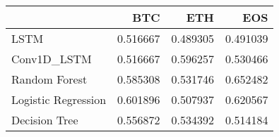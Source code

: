 \begin{tabular}{lrrr}
\toprule
{} &       BTC &       ETH &       EOS \\
\midrule
LSTM                &  0.516667 &  0.489305 &  0.491039 \\
Conv1D\_LSTM         &  0.516667 &  0.596257 &  0.530466 \\
Random Forest       &  0.585308 &  0.531746 &  0.652482 \\
Logistic Regression &  0.601896 &  0.507937 &  0.620567 \\
Decision Tree       &  0.556872 &  0.534392 &  0.514184 \\
\bottomrule
\end{tabular}

